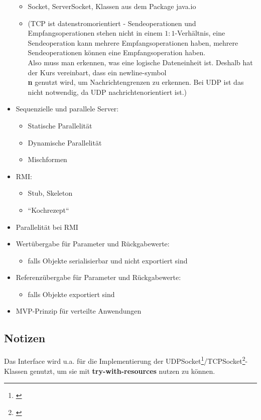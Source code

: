 \begin{itemize}
    \begin{itemize}
        \item Socket, ServerSocket, Klassen aus dem Package java.io
        \item[] (TCP ist datenstromorientiert - Sendeoperationen und Empfangsoperationen stehen nicht in einem $1:1$-Verhältnis, eine Sendeoperation kann mehrere Empfangsoperationen haben, mehrere Sendeoperationen können eine Empfangsoperation haben.\\
        Also muss man erkennen, was eine logische Dateneinheit ist.
        Deshalb hat der Kurs vereinbart, dass ein newline-symbol \textbf{\\n} genutzt wird, um Nachrichtengrenzen zu erkennen.
        Bei UDP ist das nicht notwendig, da UDP nachrichtenorientiert ist.)
    \end{itemize}
    \item Sequenzielle und parallele Server:
    \begin{itemize}
        \item Statische Parallelität
        \item Dynamische Parallelität
        \item Mischformen
    \end{itemize}
    \item RMI:
    \begin{itemize}
        \item Stub, Skeleton
        \item ``Kochrezept``
    \end{itemize}
    \item Parallelität bei RMI
    \item Wertübergabe für Parameter und Rückgabewerte:
    \begin{itemize}
        \item falls Objekte serialisierbar und nicht exportiert sind
    \end{itemize}
    \item Referenzübergabe für Parameter und Rückgabewerte:
    \begin{itemize}
        \item falls Objekte exportiert sind
    \end{itemize}
    \item MVP-Prinzip für verteilte Anwendungen
\end{itemize}

\subsection{Notizen}
Das Interface  wird u.a. für die Implementierung der UDPSocket\footnote{\cite[269, Listing 5.1]{Oec22}}/TCPSocket\footnote{\cite[286, Listing 5.7]{Oec22}}-Klassen genutzt, um sie mit \textbf{try-with-resources} nutzen zu können.\\

